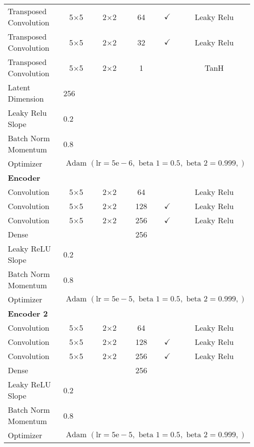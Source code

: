 \begin{longtable}[c]{@{}lccccc@{}}
	Transposed Convolution & \multicolumn{1}{c}{5$\times$5} & 2$\times$2 & 64 & $\checkmark$ & Leaky Relu \\
	Transposed Convolution & \multicolumn{1}{c}{5$\times$5} & 2$\times$2 & 32 & $\checkmark$ & Leaky Relu \\
	Transposed Convolution & \multicolumn{1}{c}{5$\times$5} & 2$\times$2 & 1 &  & TanH\\
	Latent Dimension & \multicolumn{5}{l}{256} \\
	Leaky Relu Slope & \multicolumn{5}{l}{0.2} \\
	Batch Norm Momentum & \multicolumn{5}{l}{0.8} \\
	Optimizer & \multicolumn{5}{l}{$\text { Adam }(\mathrm{lr}=5 \mathrm{e}-6, \text { beta } 1=0.5, \text { beta } 2=0.999,)$} \\ \hline
	\multicolumn{6}{l}{\textbf{Encoder}} \\
	Convolution & \multicolumn{1}{c}{5$\times$5} & 2$\times$2 & 64 &  & Leaky Relu \\
	Convolution & \multicolumn{1}{c}{5$\times$5} & 2$\times$2 & 128 & $\checkmark$ & Leaky Relu \\
	Convolution & \multicolumn{1}{c}{5$\times$5} & 2$\times$2 & 256 & $\checkmark$ & Leaky Relu \\
	Dense & \multicolumn{1}{c}{} &  & 256 &  &  \\ 
	Leaky ReLU Slope & \multicolumn{5}{l}{0.2} \\
	Batch Norm Momentum & \multicolumn{5}{l}{0.8} \\
	Optimizer & \multicolumn{5}{l}{$\text { Adam }(\mathrm{lr}=5 \mathrm{e}-5, \text { beta } 1=0.5, \text { beta } 2=0.999,)$} \\ \hline
	\multicolumn{6}{l}{\textbf{Encoder 2}} \\
	Convolution & \multicolumn{1}{c}{5$\times$5} & 2$\times$2 & 64 &  & Leaky Relu \\
	Convolution & \multicolumn{1}{c}{5$\times$5} & 2$\times$2 & 128 & $\checkmark$ & Leaky Relu \\
	Convolution & \multicolumn{1}{c}{5$\times$5} & 2$\times$2 & 256 & $\checkmark$ & Leaky Relu \\
	Dense & \multicolumn{1}{c}{} &  & 256 &  &  \\ 
	Leaky ReLU Slope & \multicolumn{5}{l}{0.2} \\
	Batch Norm Momentum & \multicolumn{5}{l}{0.8} \\
	Optimizer & \multicolumn{5}{l}{$\text { Adam }(\mathrm{lr}=5 \mathrm{e}-5, \text { beta } 1=0.5, \text { beta } 2=0.999,)$} \\ \hline

\end{longtable}
